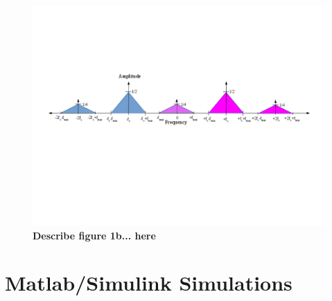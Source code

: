 \documentclass[letterpaper,12pt]{article}
\begin{document}
\begin{figure}[ht] 
\includegraphics[width=1.0\columnwidth]{prelab1-figure1b}
\caption{
\label{fig:hw1-figure1b}
{\bf Describe figure 1b...
here}
}
\end{figure}


\section{Matlab/Simulink Simulations}
\end{document}
